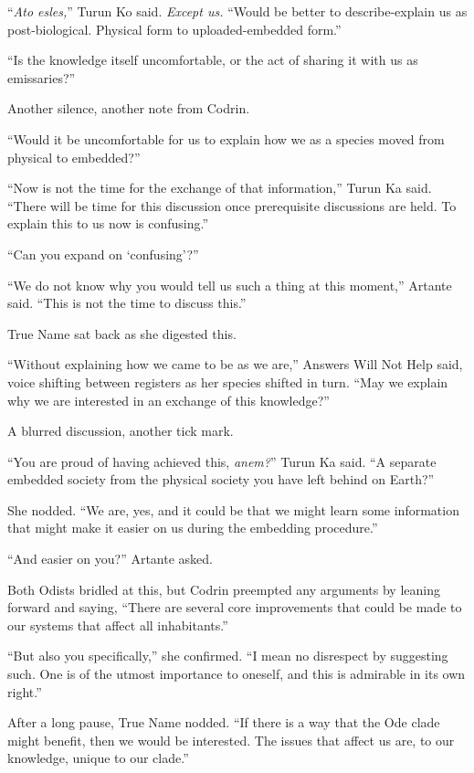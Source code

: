 ``\emph{Ato esles,}'' Turun Ko said. \emph{Except us.} ``Would be better to describe-explain us as post-biological. Physical form to uploaded-embedded form.''

``Is the knowledge itself uncomfortable, or the act of sharing it with us as emissaries?''

Another silence, another note from Codrin.

``Would it be uncomfortable for us to explain how we as a species moved from physical to embedded?''

``Now is not the time for the exchange of that information,'' Turun Ka said. ``There will be time for this discussion once prerequisite discussions are held. To explain this to us now is confusing.''

``Can you expand on `confusing'?''

``We do not know why you would tell us such a thing at this moment,'' Artante said. ``This is not the time to discuss this.''

True Name sat back as she digested this.

``Without explaining how we came to be as we are,'' Answers Will Not Help said, voice shifting between registers as her species shifted in turn. ``May we explain why we are interested in an exchange of this knowledge?''

A blurred discussion, another tick mark.

``You are proud of having achieved this, \emph{anem?}'' Turun Ka said. ``A separate embedded society from the physical society you have left behind on Earth?''

She nodded. ``We are, yes, and it could be that we might learn some information that might make it easier on us during the embedding procedure.''

``And easier on you?'' Artante asked.

Both Odists bridled at this, but Codrin preempted any arguments by leaning forward and saying, ``There are several core improvements that could be made to our systems that affect all inhabitants.''

``But also you specifically,'' she confirmed. ``I mean no disrespect by suggesting such. One is of the utmost importance to oneself, and this is admirable in its own right.''

After a long pause, True Name nodded. ``If there is a way that the Ode clade might benefit, then we would be interested. The issues that affect us are, to our knowledge, unique to our clade.''

